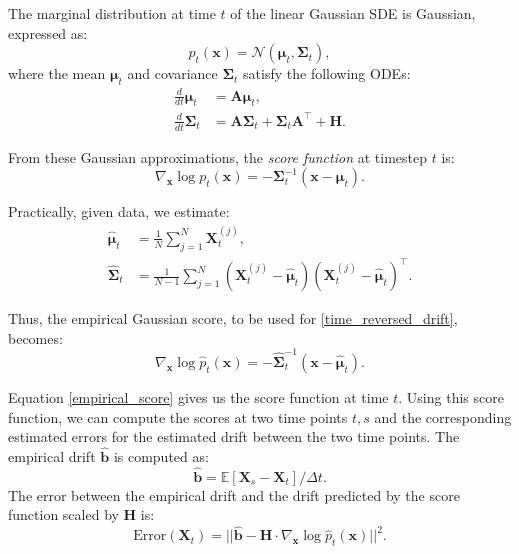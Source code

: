 \documentclass[conference]{IEEEtran}
\begin{document}
The marginal distribution at time $t$ of the linear Gaussian SDE is Gaussian, expressed as:
\[
    p_t(\mathbf{x}) = \mathcal{N}(\boldsymbol{\mu}_t, \boldsymbol{\Sigma}_t),
\]
where the mean $\boldsymbol{\mu}_t$ and covariance $\boldsymbol{\Sigma}_t$ satisfy the following ODEs:
\begin{align*}
    \frac{d}{dt}\boldsymbol{\mu}_t &= \mathbf{A}\boldsymbol{\mu}_t, \\
    \frac{d}{dt}\boldsymbol{\Sigma}_t &= \mathbf{A}\boldsymbol{\Sigma}_t + \boldsymbol{\Sigma}_t\mathbf{A}^{\top} + \mathbf{H}.
\end{align*}

From these Gaussian approximations, the \emph{score function} at timestep $t$ is:
\[
    \nabla_{\mathbf{x}}\log p_t(\mathbf{x}) = -\boldsymbol{\Sigma}_t^{-1}(\mathbf{x}-\boldsymbol{\mu}_t).
\]

Practically, given data, we estimate:
\begin{align}
    \hat{\boldsymbol{\mu}}_t &= \frac{1}{N}\sum_{j=1}^{N}\mathbf{X}^{(j)}_t, \label{mean_est}\\
    \hat{\boldsymbol{\Sigma}}_t &= \frac{1}{N-1}\sum_{j=1}^{N}(\mathbf{X}^{(j)}_t - \hat{\boldsymbol{\mu}}_t)(\mathbf{X}^{(j)}_t - \hat{\boldsymbol{\mu}}_t)^{\top}.\label{cov_est}
\end{align}

Thus, the empirical Gaussian score, to be used for \eqref{time_reversed_drift}, becomes:
\begin{equation}\label{empirical_score}
    \nabla_{\mathbf{x}}\log \hat{p}_t(\mathbf{x}) = -\hat{\boldsymbol{\Sigma}}_t^{-1}(\mathbf{x}-\hat{\boldsymbol{\mu}}_t).
\end{equation}

Equation \eqref{empirical_score} gives us the score function at time $t$. Using this score function, we can compute the
scores at two time points $t, s$ and the corresponding estimated errors for the estimated drift between the two time points.
The empirical drift $\hat{\mathbf{b}}$ is computed as:
\begin{equation}\label{empirical_drift}
    \hat{\mathbf{b}} = \mathbb{E}[\mathbf{X}_s - \mathbf{X}_t]/\Delta t.
\end{equation}
The error between the empirical drift and the drift predicted by the score function scaled by $\mathbf{H}$ is:
\begin{equation}\label{error}
    \text{Error}(\mathbf{X}_t) = ||\hat{\mathbf{b}} - \mathbf{H}\cdot\nabla_{\mathbf{x}}\log \hat{p}_t(\mathbf{x})||^2.
\end{equation}
\end{document}

